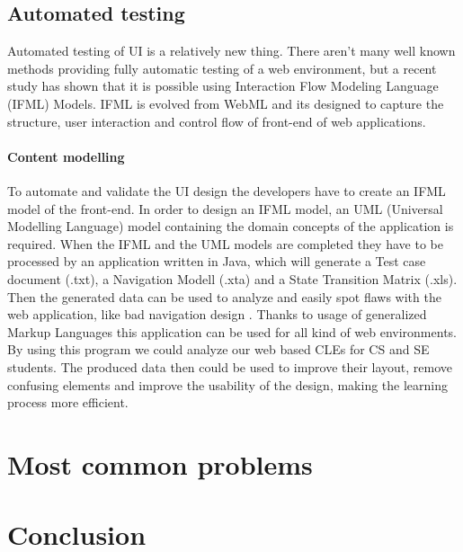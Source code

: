 \documentclass[10pt,english,a4paper]{article}
\begin{document}
\subsection{Automated testing}
Automated testing of UI is a relatively new thing\cite{automated_testing_ifml}. There aren't many well known methods
providing fully automatic testing of a web environment, but a recent study has shown that
it is possible using Interaction Flow Modeling Language (IFML) Models\cite{automated_testing_ifml}.
IFML is evolved from WebML and its designed to capture the structure, user interaction and control
flow of front-end of web applications\cite{automated_testing_ifml}.


\paragraph{Content modelling}
To automate and validate the UI design the developers have to create an IFML model
of the front-end. In order to design an IFML model, an UML (Universal Modelling Language) model 
containing the domain concepts of the application is required\cite{automated_testing_ifml}. 
When the IFML and the UML models are completed they have to be processed by an application written 
in Java, which will generate a Test case document (.txt), a Navigation Modell (.xta) and a State Transition 
Matrix (.xls). Then the generated data can be used to analyze and easily spot flaws with the web application, like bad navigation design
\cite{automated_testing_ifml}. 
Thanks to usage of generalized Markup Languages this application can be used for all kind of web environments. 
By using this program we could analyze our web based CLEs for CS and SE students. 
The produced data then could be used to improve their layout, remove confusing elements and improve the usability of the design,
making the learning process more efficient.


\section{Most common problems}\label{problems}


\section{Conclusion}




\end{document}
